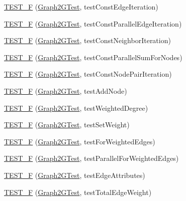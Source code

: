 \begin{DoxyCompactItemize}
\item 
\hyperlink{namespace_networ_kit_adc14ebd4b06325a8f4ed524e074203aa}{T\-E\-S\-T\-\_\-\-F} (\hyperlink{class_networ_kit_1_1_graph2_g_test}{Graph2\-G\-Test}, test\-Const\-Edge\-Iteration)
\item 
\hyperlink{namespace_networ_kit_a5f7c6d1e07e84c8857de0de844577b16}{T\-E\-S\-T\-\_\-\-F} (\hyperlink{class_networ_kit_1_1_graph2_g_test}{Graph2\-G\-Test}, test\-Const\-Parallel\-Edge\-Iteration)
\item 
\hyperlink{namespace_networ_kit_a2cf816430e383e3b47f51bd7cc47e96b}{T\-E\-S\-T\-\_\-\-F} (\hyperlink{class_networ_kit_1_1_graph2_g_test}{Graph2\-G\-Test}, test\-Const\-Neighbor\-Iteration)
\item 
\hyperlink{namespace_networ_kit_a5f22b93f8aea3f6970aaea8759635eec}{T\-E\-S\-T\-\_\-\-F} (\hyperlink{class_networ_kit_1_1_graph2_g_test}{Graph2\-G\-Test}, test\-Const\-Parallel\-Sum\-For\-Nodes)
\item 
\hyperlink{namespace_networ_kit_afd34fb7563a7b4fcde46773d0cc60e64}{T\-E\-S\-T\-\_\-\-F} (\hyperlink{class_networ_kit_1_1_graph2_g_test}{Graph2\-G\-Test}, test\-Const\-Node\-Pair\-Iteration)
\item 
\hyperlink{namespace_networ_kit_a430f8132c2c2aa7869c9fb981a21289a}{T\-E\-S\-T\-\_\-\-F} (\hyperlink{class_networ_kit_1_1_graph2_g_test}{Graph2\-G\-Test}, test\-Add\-Node)
\item 
\hyperlink{namespace_networ_kit_a1e522046082d6d3a8114ed198227a474}{T\-E\-S\-T\-\_\-\-F} (\hyperlink{class_networ_kit_1_1_graph2_g_test}{Graph2\-G\-Test}, test\-Weighted\-Degree)
\item 
\hyperlink{namespace_networ_kit_a72e4e7cf169c46cdb2b30a708e78b1c5}{T\-E\-S\-T\-\_\-\-F} (\hyperlink{class_networ_kit_1_1_graph2_g_test}{Graph2\-G\-Test}, test\-Set\-Weight)
\item 
\hyperlink{namespace_networ_kit_a220b9f3564ad2a3ca002e7e5a4b0df0a}{T\-E\-S\-T\-\_\-\-F} (\hyperlink{class_networ_kit_1_1_graph2_g_test}{Graph2\-G\-Test}, test\-For\-Weighted\-Edges)
\item 
\hyperlink{namespace_networ_kit_a585f39c9a28f9e64c9ce018120fb018c}{T\-E\-S\-T\-\_\-\-F} (\hyperlink{class_networ_kit_1_1_graph2_g_test}{Graph2\-G\-Test}, test\-Parallel\-For\-Weighted\-Edges)
\item 
\hyperlink{namespace_networ_kit_a0168a4bed98948b1fa07d617dd5585bb}{T\-E\-S\-T\-\_\-\-F} (\hyperlink{class_networ_kit_1_1_graph2_g_test}{Graph2\-G\-Test}, test\-Edge\-Attributes)
\item 
\hyperlink{namespace_networ_kit_ad517c068acc59ed40d4236c225ab942a}{T\-E\-S\-T\-\_\-\-F} (\hyperlink{class_networ_kit_1_1_graph2_g_test}{Graph2\-G\-Test}, test\-Total\-Edge\-Weight)

\end{DoxyCompactItemize}
